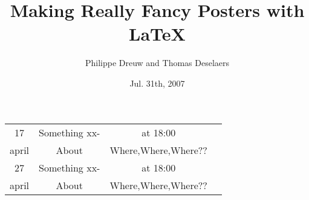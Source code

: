 \documentclass[final]{beamer} %
\title[Fancy Posters]{Making Really Fancy Posters with \LaTeX}
\author[Dreuw \& Deselaers]{Philippe Dreuw and Thomas Deselaers}
\institute[RWTH Aachen University]{Human Language Technology and Pattern Recognition,RWTH Aachen University}
\date{Jul. 31th, 2007}
\begin{document}
\begin{frame}{} 
\vfill

 \centering
\begin{table}
\begin{tabular}{| c | c | c | c |}

  {\Large 17 }   & {\Large Something} xx-  & {\normalsize at 18:00}\\
  {\normalsize april} & {\normalsize About} & {\footnotesize Where,Where,Where??}\\
  \hline  \hline
  {\Large 27 }   & {\Large Something} xx-  & {\normalsize at 18:00}\\
  {\normalsize april} & {\normalsize About} & {\footnotesize Where,Where,Where??}\\
\end{tabular}
\end{table}
\vfill
\end{frame}
\end{document}
